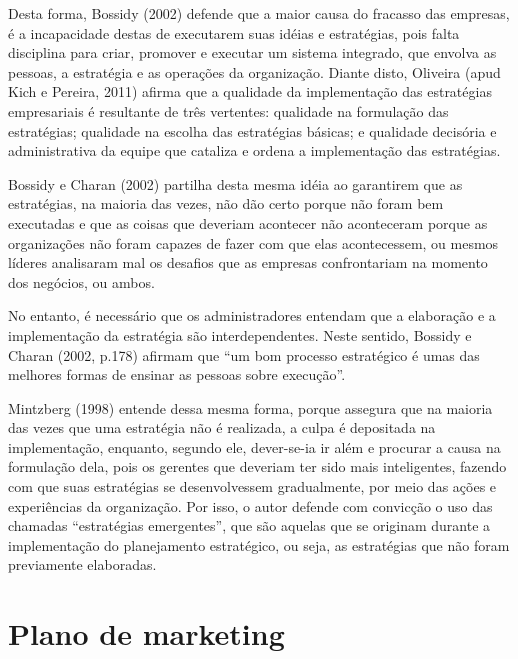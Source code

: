 \documentclass[
	12pt,				%
	openright,			%
	oneside,			%
	a4paper,			%
	english,			%
	french,				%
	spanish,			%
	brazil				%
	]{abntex2}
\begin{document}
	Desta forma, Bossidy (2002) defende que a maior causa do fracasso das empresas, é a incapacidade destas de executarem suas idéias e estratégias, pois falta disciplina para criar, promover e executar um sistema integrado, que envolva as pessoas, a estratégia e as operações da organização. Diante disto, Oliveira (apud Kich e Pereira, 2011) afirma que a qualidade da implementação das estratégias empresariais é resultante de três vertentes: qualidade na formulação das estratégias; qualidade na escolha das estratégias básicas; e qualidade decisória e administrativa da equipe que cataliza e ordena a implementação das estratégias. 
	
	Bossidy e Charan (2002) partilha desta mesma idéia ao garantirem que as estratégias, na maioria das vezes, não dão certo porque não foram bem executadas e que as coisas que deveriam acontecer não aconteceram porque as organizações não foram capazes de fazer com que elas acontecessem, ou mesmos líderes analisaram mal os desafios que as empresas confrontariam na momento dos negócios, ou ambos. 
	
	No entanto, é necessário que os administradores entendam que a elaboração e a implementação da estratégia são interdependentes. Neste sentido, Bossidy e Charan (2002, p.178) afirmam que “um bom processo estratégico é umas das melhores formas de ensinar as pessoas sobre execução”. 
	
	Mintzberg (1998) entende dessa mesma forma, porque assegura que na maioria das vezes que uma estratégia não é realizada, a culpa é depositada na implementação, enquanto, segundo ele, dever-se-ia ir além e procurar a causa na formulação dela, pois os gerentes que deveriam ter sido mais inteligentes, fazendo com que suas estratégias se desenvolvessem gradualmente, por meio das ações e experiências da organização. Por isso, o autor defende com convicção o uso das chamadas “estratégias emergentes”, que são aquelas que se originam durante a implementação do planejamento estratégico, ou seja, as estratégias que não foram previamente elaboradas.
	
\section[Plano de marketing]{Plano de marketing}
\end{document}
